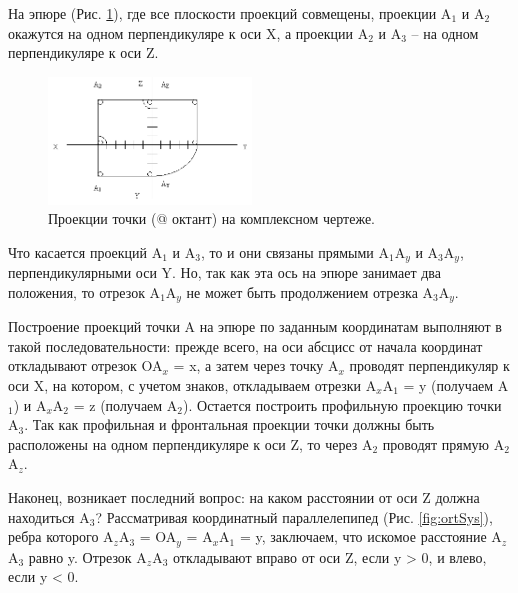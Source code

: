 \documentclass[13pt]{extarticle}
\makeatletter
\newcommand*{\rom}[1]{\expandafter\@slowromancap\romannumeral #1@}
\makeatother
\begin{document}
На эпюре (Рис. \ref{fig:complProj}), где все плоскости проекций совмещены, проекции A$_1$ и A$_2$ окажутся на одном перпендикуляре к оси X, а проекции A$_2$ и A$_3$ -- на одном перпендикуляре к оси Z. 

	\begin{figure} 
		\includegraphics[width=0.48\textwidth]{Images/complexProj}
		\caption{Проекции точки (\rom{1} октант) на комплексном чертеже.}
		\label{fig:complProj}
	
	\end{figure}
	
Что касается проекций A$_1$ и A$_3$, то и они связаны прямыми A$_1$A$_y$ и A$_3$A$_y$, перпендикулярными оси Y. Но, так как эта ось на эпюре занимает два положения, то отрезок A$_1$A$_y$ не может быть продолжением отрезка A$_3$A$_y$.

Построение проекций точки A на эпюре по заданным координатам выполняют в такой последовательности: прежде всего, на оси абсцисс от начала координат откладывают отрезок OA$_x$ = x, а затем через точку A$_x$ проводят перпендикуляр к оси X, на котором, с учетом знаков, откладываем отрезки A$_x$A$_1$ = y (получаем A$_1$) и A$_x$A$_2$ = z (получаем A$_2$). Остается построить профильную проекцию точки A$_3$. Так как профильная и фронтальная проекции точки должны быть расположены на одном перпендикуляре к оси Z, то через A$_2$ проводят прямую A$_2$A$_z$.

Наконец, возникает последний вопрос: на каком расстоянии от оси Z должна находиться A$_3$? Рассматривая координатный параллелепипед (Рис. \ref{fig:ortSys}), ребра которого A$_z$A$_3$ = OA$_y$ = A$_x$A$_1$ = y, заключаем, что искомое расстояние 
A$_z$A$_3$ равно y. Отрезок A$_z$A$_3$ 
откладывают вправо от оси Z, если y > 0,
 и влево, если y < 0.
 
\end{document}
